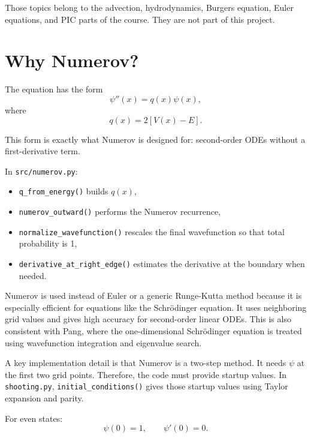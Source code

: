 \documentclass[11pt]{article}
\begin{document}
    Those topics belong to the advection, hydrodynamics, Burgers equation, Euler equations, and PIC parts of the course. They are not part of this project.

    \section{Why Numerov?}

    The equation has the form
    \begin{equation}
        \psi''(x)=q(x)\psi(x),
    \end{equation}
    where
    \begin{equation}
        q(x)=2[V(x)-E].
    \end{equation}

    This form is exactly what Numerov is designed for: second-order ODEs without a first-derivative term.

    In \texttt{src/numerov.py}:
    \begin{itemize}
        \item \texttt{q\_from\_energy()} builds $q(x)$,
        \item \texttt{numerov\_outward()} performs the Numerov recurrence,
        \item \texttt{normalize\_wavefunction()} rescales the final wavefunction so that total probability is 1,
        \item \texttt{derivative\_at\_right\_edge()} estimates the derivative at the boundary when needed.
    \end{itemize}

    Numerov is used instead of Euler or a generic Runge-Kutta method because it is especially efficient for equations like the Schr\"odinger equation. It uses neighboring grid values and gives high accuracy for second-order linear ODEs. This is also consistent with Pang, where the one-dimensional Schr\"odinger equation is treated using wavefunction integration and eigenvalue search.

    A key implementation detail is that Numerov is a two-step method. It needs $\psi$ at the first two grid points. Therefore, the code must provide startup values. In \texttt{shooting.py}, \texttt{initial\_conditions()} gives those startup values using Taylor expansion and parity.

    For even states:
    \begin{equation}
        \psi(0)=1, \qquad \psi'(0)=0.
    \end{equation}
\end{document}
